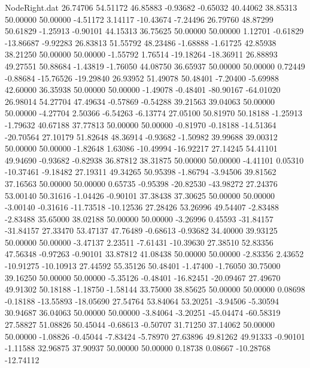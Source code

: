 \begin{filecontents}{NodeRight.dat}
  26.74706   54.51172   46.85883    -0.93682   -0.65032   40.44062   38.85313   50.00000   50.00000   -4.51172    3.14117  -10.43674   -7.24496
  26.79760   48.87299   50.61829    -1.25913   -0.90101   44.15313   36.75625   50.00000   50.00000    1.12701   -0.61829  -13.86687   -9.92283
  26.83813   51.55792   48.23486    -1.68888   -1.61725   42.85938   38.21250   50.00000   50.00000   -1.55792    1.76514  -19.18264  -18.36911
  26.88893   49.27551   50.88684    -1.43819   -1.76050   44.08750   36.65937   50.00000   50.00000    0.72449   -0.88684  -15.76526  -19.29840
  26.93952   51.49078   50.48401    -7.20400   -5.69988   42.60000   36.35938   50.00000   50.00000   -1.49078   -0.48401  -80.90167  -64.01020
  26.98014   54.27704   47.49634    -0.57869   -0.54288   39.21563   39.04063   50.00000   50.00000   -4.27704    2.50366   -6.54263   -6.13774
  27.05100   50.81970   50.18188    -1.25913   -1.79632   40.67188   37.77813   50.00000   50.00000   -0.81970   -0.18188  -14.51364  -20.70564
  27.10179   51.82648   48.36914    -0.93682   -1.50982   39.99688   39.00312   50.00000   50.00000   -1.82648    1.63086  -10.49994  -16.92217
  27.14245   54.41101   49.94690    -0.93682   -0.82938   36.87812   38.31875   50.00000   50.00000   -4.41101    0.05310  -10.37461   -9.18482
  27.19311   49.34265   50.95398    -1.86794   -3.94506   39.81562   37.16563   50.00000   50.00000    0.65735   -0.95398  -20.82530  -43.98272
  27.24376   53.00140   50.31616    -1.04426   -0.90101   37.38438   37.30625   50.00000   50.00000   -3.00140   -0.31616  -11.73518  -10.12536
  27.28426   53.26996   49.54407    -2.83488   -2.83488   35.65000   38.02188   50.00000   50.00000   -3.26996    0.45593  -31.84157  -31.84157
  27.33470   53.47137   47.76489    -0.68613   -0.93682   34.40000   39.93125   50.00000   50.00000   -3.47137    2.23511   -7.61431  -10.39630
  27.38510   52.83356   47.56348    -0.97263   -0.90101   33.87812   41.08438   50.00000   50.00000   -2.83356    2.43652  -10.91275  -10.10913
  27.44592   55.35126   50.48401    -1.47400   -1.76050   30.75000   39.16250   50.00000   50.00000   -5.35126   -0.48401  -16.82451  -20.09467
  27.49670   49.91302   50.18188    -1.18750   -1.58144   33.75000   38.85625   50.00000   50.00000    0.08698   -0.18188  -13.55893  -18.05690
  27.54764   53.84064   53.20251    -3.94506   -5.30594   30.94687   36.04063   50.00000   50.00000   -3.84064   -3.20251  -45.04474  -60.58319
  27.58827   51.08826   50.45044    -0.68613   -0.50707   31.71250   37.14062   50.00000   50.00000   -1.08826   -0.45044   -7.83424   -5.78970
  27.63896   49.81262   49.91333    -0.90101   -1.11588   32.96875   37.90937   50.00000   50.00000    0.18738    0.08667  -10.28768  -12.74112

\end{filecontents}

